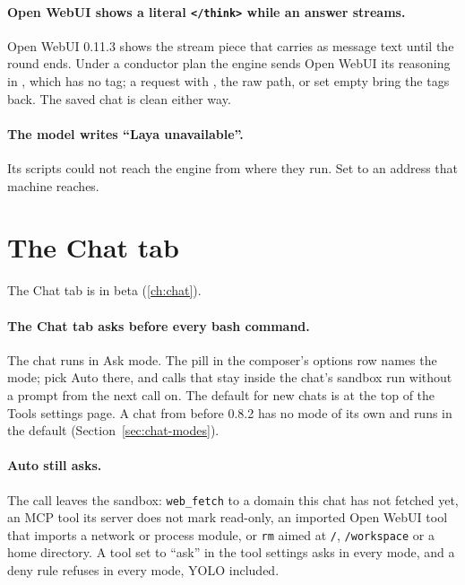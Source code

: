 \paragraph{Open WebUI shows a literal \texttt{</think>} while an answer streams.} Open WebUI 0.11.3 shows the stream piece that carries  as message text until the round ends. Under a conductor plan the engine sends Open WebUI its reasoning in , which has no tag; a request with , the raw path, or  set empty bring the tags back. The saved chat is clean either way.

\paragraph{The model writes ``Laya unavailable''.} Its scripts could not reach the engine from where they run. Set  to an address that machine reaches.

\section{The Chat tab}\label{sec:trouble-chat}

The Chat tab is in beta (\ref{ch:chat}).

\paragraph{The Chat tab asks before every bash command.} The chat runs in Ask mode. The pill in the composer's options row names the mode; pick Auto there, and calls that stay inside the chat's sandbox run without a prompt from the next call on. The default for new chats is at the top of the Tools settings page. A chat from before 0.8.2 has no mode of its own and runs in the default (Section~\ref{sec:chat-modes}).

\paragraph{Auto still asks.} The call leaves the sandbox: \texttt{web\_fetch} to a domain this chat has not fetched yet, an MCP tool its server does not mark read-only, an imported Open WebUI tool that imports a network or process module, or \texttt{rm} aimed at \texttt{/}, \texttt{/workspace} or a home directory. A tool set to \enquote{ask} in the tool settings asks in every mode, and a deny rule refuses in every mode, YOLO included.

